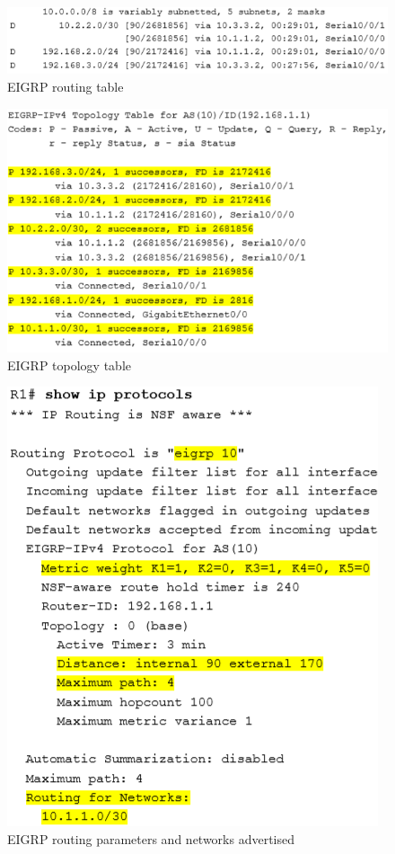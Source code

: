 \begin{enumerate}
	\begin{figure}[hbtp]
		\caption{EIGRP routing table}\label{EIGRProutingTable}
		\centering
		\includegraphics[scale=0.8]{pictures/EIGRProutingTable.PNG}
		\end{figure}
 	
	\begin{figure}[hbtp]
			\caption{EIGRP topology table}\label{EIGRPtopologyTable}
			\centering
			\includegraphics[scale=0.8]{pictures/EIGRPtopologyTable.PNG}
			\end{figure}


	\begin{figure}[hbtp]
	\caption{EIGRP routing parameters and networks advertised}\label{EIGRPparameters}
	\centering
	\includegraphics[scale=0.8]{pictures/EIGRPparameters.PNG}
	\end{figure}
						
\end{enumerate}

